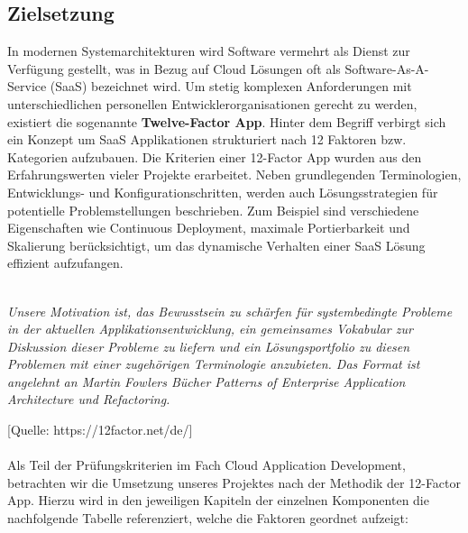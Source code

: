 \subsection{Zielsetzung}
In modernen Systemarchitekturen wird Software vermehrt als Dienst zur Verfügung gestellt, was in Bezug auf Cloud Lösungen oft als Software-As-A-Service (SaaS) bezeichnet wird.  Um stetig komplexen Anforderungen mit unterschiedlichen personellen Entwicklerorganisationen  gerecht zu werden, existiert die sogenannte \textbf{Twelve-Factor App}. Hinter dem Begriff verbirgt sich ein Konzept um SaaS Applikationen strukturiert nach 12 Faktoren bzw. Kategorien aufzubauen. Die Kriterien einer 12-Factor App wurden aus den Erfahrungswerten vieler Projekte erarbeitet. Neben grundlegenden Terminologien, Entwicklungs- und Konfigurationschritten, werden auch Lösungsstrategien für potentielle Problemstellungen beschrieben. Zum Beispiel sind verschiedene Eigenschaften wie Continuous Deployment, maximale Portierbarkeit und Skalierung berücksichtigt, um das dynamische Verhalten einer SaaS Lösung effizient aufzufangen.\\ \\
\begin{itshape}
\emph{Unsere Motivation ist, das Bewusstsein zu schärfen für systembedingte Probleme in der aktuellen Applikationsentwicklung, ein gemeinsames Vokabular zur Diskussion dieser Probleme zu liefern und ein Lösungsportfolio zu diesen Problemen mit einer zugehörigen Terminologie anzubieten. Das Format ist angelehnt an Martin Fowlers Bücher Patterns of Enterprise Application Architecture und Refactoring.}
\end{itshape} 
[Quelle: https://12factor.net/de/] \\ \\
Als Teil der Prüfungskriterien im Fach Cloud Application Development, betrachten wir die Umsetzung unseres Projektes nach der Methodik der 12-Factor App. Hierzu wird in den jeweiligen Kapiteln der einzelnen Komponenten die nachfolgende Tabelle referenziert, welche die Faktoren geordnet aufzeigt:
